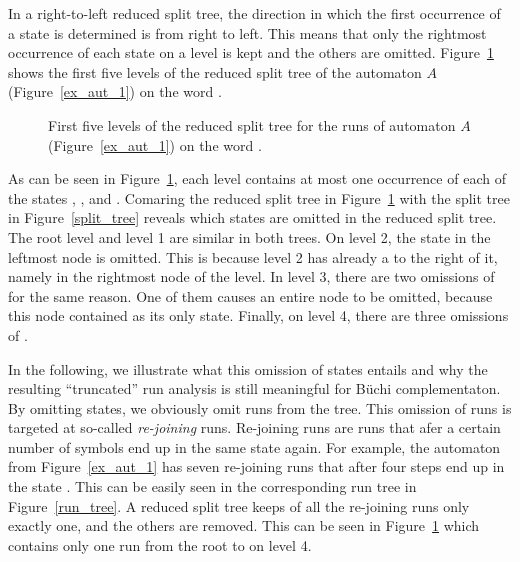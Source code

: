 In a right-to-left reduced split tree, the direction in which the first occurrence of a state is determined is from right to left. This means that only the rightmost occurrence of each state on a level is kept and the others are omitted. Figure~\ref{reduced_split_tree} shows the first five levels of the reduced split tree of the automaton $A$ (Figure~\ref{ex_aut_1}) on the word \aom.


\begin{figure}[htb]
\centering
\ReducedSplitTreeRightLeft
\caption{First five levels of the reduced split tree for the runs of automaton $A$ (Figure~\ref{ex_aut_1}) on the word \aom.}
\label{reduced_split_tree}
\end{figure}

As can be seen in Figure~\ref{reduced_split_tree}, each level contains at most one occurrence of each of the states , , and . Comaring the reduced split tree in Figure~\ref{reduced_split_tree} with the split tree in Figure~\ref{split_tree} reveals which states are omitted in the reduced split tree. The root level and level 1 are similar in both trees. On level 2, the state  in the leftmost node is omitted. This is because level 2 has already a  to the right of it, namely in the rightmost node of the level. In level 3, there are two omissions of  for the same reason. One of them causes an entire node to be omitted, because this node contained  as its only state. Finally, on level 4, there are three omissions of .

In the following, we illustrate what this omission of states entails and why the resulting ``truncated'' run analysis is still meaningful for Büchi complementaton. By omitting states, we obviously omit runs from the tree. This omission of runs is targeted at so-called \textit{re-joining} runs. Re-joining runs are runs that afer a certain number of symbols end up in the same state again. For example, the automaton from Figure~\ref{ex_aut_1} has seven re-joining runs that after four steps end up in the state . This can be easily seen in the corresponding run tree in Figure~\ref{run_tree}. A reduced split tree keeps of all the re-joining runs only exactly one, and the others are removed. This can be seen in Figure~\ref{reduced_split_tree} which contains only one run from the root to  on level 4.

